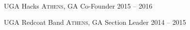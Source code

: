 \documentclass[10pt,a4paper]{article}
\begin{document}
\headedsection
  {{UGA Hacks}}
  {\textsc{Athens, GA}} {%
  \headedsubsection
    {Co-Founder}
    {2015 -- 2016}
    {
    }
}

\headedsection
  {{UGA Redcoat Band}}
  {\textsc{Athens, GA}} {%
  \headedsubsection
    {Section Leader}
    {2014 -- 2015}
    {
    }
}

\end{document}
